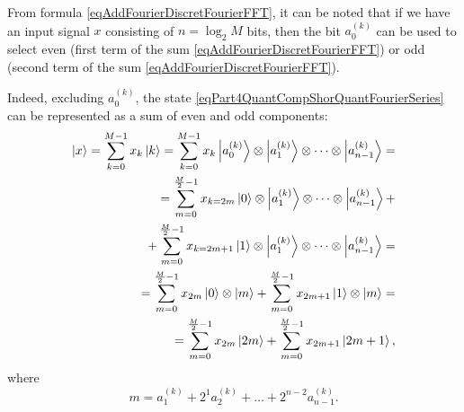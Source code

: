 From formula \eqref{eqAddFourierDiscretFourierFFT}, it can be noted that if we have an input signal $x$ consisting of $n = \log_2{M}$ bits, then the bit $a^{(k)}_0$ can be used to select even (first term of the sum \eqref{eqAddFourierDiscretFourierFFT}) or odd (second term of the sum \eqref{eqAddFourierDiscretFourierFFT}).

Indeed, excluding $a^{(k)}_0$, the state \eqref{eqPart4QuantCompShorQuantFourierSeries} can be represented as a sum of even and odd components: 
\begin{eqnarray}
\ket{x} = \sum_{k = 0}^{M - 1}x_k \ket{k} = 
\sum_{k = 0}^{M - 1}x_k \ket{a^{(k)}_0} \otimes  \ket{a^{(k)}_1}
\otimes \cdots \otimes \ket{a^{(k)}_{n-1}} = 
\nonumber \\
 = \sum_{m = 0}^{\frac{M}{2} - 1}x_{k=2m} \ket{0} \otimes  \ket{a^{(k)}_1}
\otimes \cdots \otimes \ket{a^{(k)}_{n-1}} +
\nonumber \\
+
\sum_{m = 0}^{\frac{M}{2} - 1}x_{k=2m + 1} \ket{1} \otimes  \ket{a^{(k)}_1}
\otimes \cdots \otimes \ket{a^{(k)}_{n-1}} = 
\nonumber \\
 = \sum_{m = 0}^{\frac{M}{2} - 1}x_{2m} \ket{0} \otimes  \ket{m} +
\sum_{m = 0}^{\frac{M}{2} - 1}x_{2m + 1} \ket{1} \otimes  \ket{m} = 
\nonumber \\
= \sum_{m = 0}^{\frac{M}{2} - 1}x_{2m} \ket{2m} +
\sum_{m = 0}^{\frac{M}{2} - 1}x_{2m + 1} \ket{2m+1},
\nonumber
\end{eqnarray}
where
\begin{equation}
m = a^{(k)}_1 + 2^1 a^{(k)}_2 + \dots + 2^{n-2} a^{(k)}_{n-1}.
\nonumber
\end{equation}



